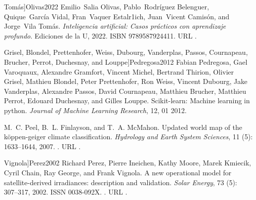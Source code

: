 \documentclass[letterpaper,12pt, twoside]{report}
\providecommand{\DIFdeltex}[1]{{\protect\color{red} \scriptsize #1}} %
\providecommand{\DIFdel}[1]{\texorpdfstring{\DIFdeltex{#1}}{}} %
\begin{document}
  Tomás]{Olivas2022}
\DIFdel{Emilio~Salia Olivas, Pablo~Rodríguez Belenguer, Quique~García Vidal,
  Fran~Vaquer Estalr1ich, Juan~Vicent Camisón, and Jorge~Vila Tomás.
}%
\DIFdel{\emph{Inteligencia artificial: Casos pr{\'a}cticos con aprendizaje
  profundo}.
}%
\DIFdel{Ediciones de la U, 2022.
}%
\DIFdel{ISBN 9789587924411.
}%
\DIFdel{URL }%
\DIFdel{.
}%

  Grisel, Blondel, Prettenhofer, Weiss, Dubourg, Vanderplas, Passos,
  Cournapeau, Brucher, Perrot, Duchesnay, and Louppe]{Pedregosa2012}
\DIFdel{Fabian Pedregosa, Gael Varoquaux, Alexandre Gramfort, Vincent Michel, Bertrand
  Thirion, Olivier Grisel, Mathieu Blondel, Peter Prettenhofer, Ron Weiss,
  Vincent Dubourg, Jake Vanderplas, Alexandre Passos, David Cournapeau,
  Matthieu Brucher, Matthieu Perrot, Edouard Duchesnay, and Gilles Louppe.
}%
\DIFdel{Scikit-learn: Machine learning in python.
}%
\DIFdel{\emph{Journal of Machine Learning Research}, 12, 01 2012.
}%

\DIFdel{M.~C. Peel, B.~L. Finlayson, and T.~A. McMahon.
}%
\DIFdel{Updated world map of the köppen-geiger climate classification.
}%
\DIFdel{\emph{Hydrology and Earth System Sciences}, 11}%
\DIFdel{(5):}%
\DIFdel{1633--1644, 2007.
}%
\DIFdel{.
}%
\DIFdel{URL }%
\DIFdel{.
}%

  Vignola]{Perez2002}
\DIFdel{Richard Perez, Pierre Ineichen, Kathy Moore, Marek Kmiecik, Cyril Chain, Ray
  George, and Frank Vignola.
}%
\DIFdel{A new operational model for satellite-derived irradiances:
  description and validation.
}%
\DIFdel{\emph{Solar Energy}, 73}%
\DIFdel{(5):}%
\DIFdel{307--317, 2002.
}%
\DIFdel{ISSN 0038-092X.
}%
\DIFdel{.
}%
\DIFdel{URL
  }%
\DIFdel{.
}%
\end{document}
